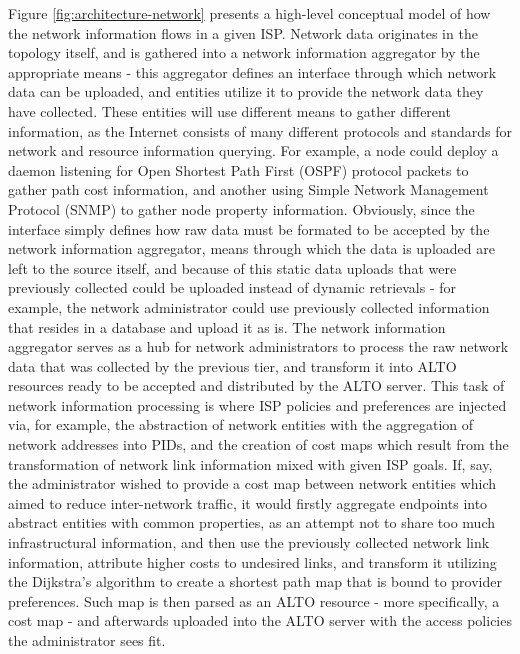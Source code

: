     Figure \ref{fig:architecture-network} presents a high-level conceptual model of how the network information flows in a given ISP.
    Network data originates in the topology itself, and is gathered into a network information aggregator by the appropriate means - this aggregator defines an interface through which network data can be uploaded, and entities utilize it to provide the network data they have collected.
    These entities will use different means to gather different information, as the Internet consists of many different protocols and standards for network and resource information querying.
    For example, a node could deploy a daemon listening for Open Shortest Path First (OSPF) protocol packets to gather path cost information, and another using Simple Network Management Protocol (SNMP) to gather node property information.
    Obviously, since the interface simply defines how raw data must be formated to be accepted by the network information aggregator, means through which the data is uploaded are left to the source itself, and because of this static data uploads that were previously collected could be uploaded instead of dynamic retrievals - for example, the network administrator could use previously collected information that resides in a database and upload it as is.
    The network information aggregator serves as a hub for network administrators to process the raw network data that was collected by the previous tier, and transform it into ALTO resources ready to be accepted and distributed by the ALTO server.
    This task of network information processing is where ISP policies and preferences are injected via, for example, the abstraction of network entities with the aggregation of network addresses into PIDs, and the creation of cost maps which result from the transformation of network link information mixed with given ISP goals.
    If, say, the administrator wished to provide a cost map between network entities which aimed to reduce inter-network traffic, it would firstly aggregate endpoints into abstract entities with common properties, as an attempt not to share too much infrastructural information, and then use the previously collected network link information, attribute higher costs to undesired links, and transform it utilizing the Dijkstra's algorithm to create a shortest path map that is bound to provider preferences.
    Such map is then parsed as an ALTO resource - more specifically, a cost map - and afterwards uploaded into the ALTO server with the access policies the administrator sees fit.

